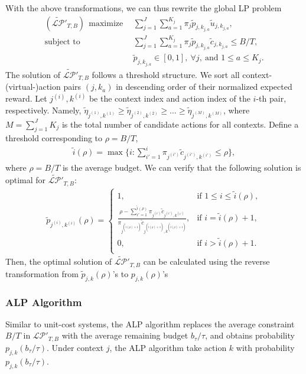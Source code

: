 With the above transformations, we can thus rewrite the global LP problem
\begin{align}
(\widetilde{{\mathcal{LP}}}'_{T,B})~~\text{maximize} &~~ \sum_{j = 1}^J \sum_{a = 1}^{K_j}\pi_j \tilde{p}_{j,k_{j,a}} \tilde{u}_{j,k_{j,a}}, \nonumber \\
\text{subject to} &~~ \sum_{j = 1}^J \sum_{a = 1}^{K_j}\pi_j \tilde{p}_{j,k_{j,a}} \tilde{c}_{j,k_{j,a}} \leq B/T, \nonumber \\
&~~ \tilde{p}_{j,k_{j,a}} \in [0,1], ~\forall j, ~\text{and $1\leq a \leq K_j$}.\nonumber
\end{align}
The solution of $\widetilde{{\mathcal{LP}}}'_{T,B}$ follows a threshold structure.
We sort all context-(virtual-)action pairs $(j,k_a)$ in descending order of their normalized expected reward. Let $j^{(i)}, k^{(i)}$ be the context index and action index of the $i$-th pair, respectively. Namely, $\tilde{\eta}_{j^{(1)}, k^{(1)}} \geq \tilde{\eta}_{j^{(2)}, k^{(2)}} \geq \ldots \geq \tilde{\eta}_{j^{(M)}, k^{(M)}}$, where $M = \sum_{j=1}^J K_j$ is the total number of candidate actions for all contexts.
Define a threshold corresponding to $\rho = B/T$,
\begin{eqnarray} %
\tilde{i}(\rho) = \max\{i: \sum_{i' = 1}^i\pi_{j^{(i')}} \tilde{c}_{j^{(i')},k^{(i')}} \leq \rho\},
\end{eqnarray}
where $\rho = B/T$ is the average budget.
We can verify that the following solution is optimal for $\widetilde{{\mathcal{LP}}}'_{T,B}$:
\begin{eqnarray}
\tilde{p}_{j^{(i)}, k^{(i)}}(\rho) =
\begin{cases}
1, &\text{if $1 \leq i \leq  \tilde{i}(\rho)$},\\
\frac{\rho - \sum_{i' = 1}^{\tilde{i}(\rho)}\pi_{j^{(i')}} \tilde{c}_{j^{(i')},k^{(i')}}}{\pi_{j^{(\tilde{i}(\rho)+1)}} \tilde{c}_{j^{(\tilde{i}(\rho)+1)},k^{(\tilde{i}(\rho)+1)}}}, & \text{if $i = \tilde{i}(\rho)+1$},\\
0, & \text{if $i > \tilde{i}(\rho) + 1$}.\\
\end{cases}\nonumber
\end{eqnarray}
Then, the optimal solution of $\widetilde{{\mathcal{LP}}}'_{T,B}$ can be calculated using the reverse transformation from
$\tilde{p}_{j, k}(\rho)$'s to ${p}_{j, k}(\rho)$'s

\subsubsection{ALP Algorithm}
Similar to unit-cost systems, the ALP algorithm replaces the average constraint $B/T$ in ${\mathcal{LP}}'_{T,B}$ with the average remaining budget $b_\tau/\tau$, and obtains probability $p_{j, k}(b_\tau/\tau)$. Under context $j$, the ALP algorithm take action $k$ with probability $p_{j, k}(b_\tau/\tau)$.

